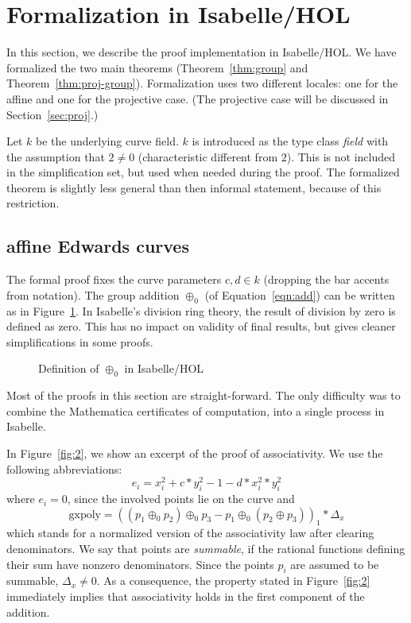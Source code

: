 \documentclass{llncs}
\begin{document}
\section{Formalization in Isabelle/HOL}

In this section, we describe the proof implementation in Isabelle/HOL.
We have formalized the two main theorems (Theorem~\ref{thm:group} and
Theorem~\ref{thm:proj-group}).  Formalization uses two different
locales: one for the affine and one for the projective case. (The
projective case will be discussed in Section~\ref{sec:proj}.)

Let $k$ be the underlying curve field. $k$ is introduced as the type
class \textit{field} with the assumption that $2 \neq 0$
(characteristic different from $2$). This is not included in the
simplification set, but used when needed during the proof.  The
formalized theorem is slightly less general than then informal
statement, because of this restriction.


\subsection{affine Edwards curves}

The formal proof fixes the curve parameters $c,d \in k$ (dropping the
bar accents from notation). The group addition $\oplus_0$ (of
Equation~\ref{eqn:add}) can be written as in Figure~\ref{fig:1}.  In
Isabelle's division ring theory, the result of division by zero is
defined as zero. This has no impact on validity of final results, but
gives cleaner simplifications in some proofs.

\begin{figure}
	{}
	\caption{Definition of $\oplus_0$ in Isabelle/HOL}
	\label{fig:1}
\end{figure}

Most of the proofs in this section are straight-forward. The only
difficulty was to combine the Mathematica certificates of computation, 
into a single process in Isabelle.

In Figure~\ref{fig:2}, we show an excerpt of the proof of
associativity. We use the following abbreviations: 
\[
e_i = x_i^2 + c *
y_i^2 - 1 - d * x_i^2 * y_i^2 
\] 
where $e_i = 0$, since the involved
points lie on the curve and 
\[
\text{gxpoly} = ((p_1 \oplus_0 p_2)
\oplus_0 p_3 - p_1 \oplus_0 (p_2 \oplus p_3))_1*\Delta_x
\] 
which stands for a normalized version of the associativity law after
clearing denominators. We say that points are \emph{summable}, if the
rational functions defining their sum have nonzero denominators.
Since the points $p_i$ are assumed to be summable, $\Delta_x \neq
0$. As a consequence, the property stated in Figure~\ref{fig:2}
immediately implies that associativity holds in the first component of
the addition.
\end{document}
